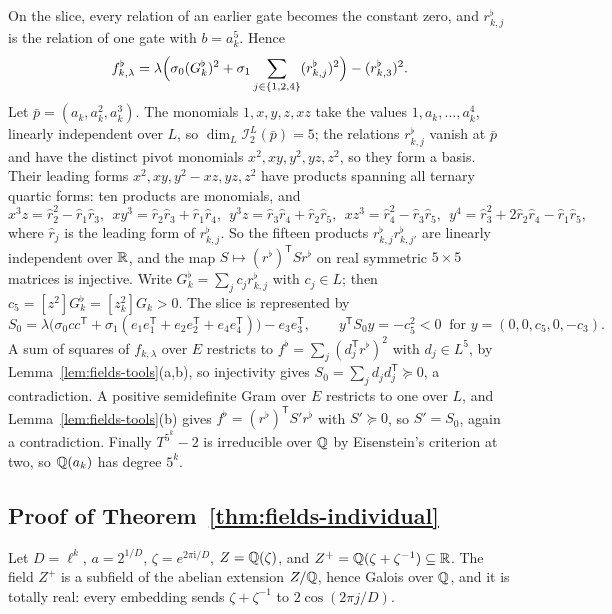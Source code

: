 On the slice, every relation of an earlier gate becomes the constant zero,
and $r_{k,j}^\flat$ is the relation of one gate with $b=a_k^5$. Hence
\[
 f_{k,\lambda}^\flat=\lambda\Bigl(\sigma_0(G_k^\flat)^2+\sigma_1\sum_{j\in\{1,2,4\}}
 (r_{k,j}^\flat)^2\Bigr)-(r_{k,3}^\flat)^2 .
\]
Let $\bar p=(a_k,a_k^2,a_k^3)$. The monomials $1,x,y,z,xz$ take the values
$1,a_k,\ldots,a_k^4$, linearly independent over $L$, so
$\dim_L\mathcal I_2^L(\bar p)=5$; the relations $r^\flat_{k,j}$ vanish at $\bar p$ and have
the distinct pivot monomials $x^2,xy,y^2,yz,z^2$, so they form a basis. Their
leading forms $x^2,xy,y^2-xz,yz,z^2$ have products spanning all ternary
quartic forms: ten products are monomials, and
\[
 x^3z=\hat r_2^2-\hat r_1\hat r_3,\ \ xy^3=\hat r_2\hat r_3+\hat r_1\hat r_4,\ \
 y^3z=\hat r_3\hat r_4+\hat r_2\hat r_5,\ \ xz^3=\hat r_4^2-\hat r_3\hat r_5,\ \
 y^4=\hat r_3^2+2\hat r_2\hat r_4-\hat r_1\hat r_5,
\]
where $\hat r_j$ is the leading form of $r^\flat_{k,j}$. So the fifteen products
$r^\flat_{k,j}r^\flat_{k,j'}$ are linearly independent over $\mathbb R$, and the map
$S\mapsto(r^\flat)^{\mathsf T}Sr^\flat$ on real symmetric $5\times5$ matrices is
injective. Write $G_k^\flat=\sum_jc_jr^\flat_{k,j}$ with $c_j\in L$; then
$c_5=[z^2]G_k^\flat=[z_k^2]G_k>0$. The slice is represented by
\[
 S_0=\lambda\bigl(\sigma_0cc^{\mathsf T}+\sigma_1(e_1e_1^{\mathsf T}
   +e_2e_2^{\mathsf T}+e_4e_4^{\mathsf T})\bigr)-e_3e_3^{\mathsf T},
 \qquad
 y^{\mathsf T}S_0y=-c_5^2<0\ \text{ for }y=(0,0,c_5,0,-c_3).
\]
A sum of squares of $f_{k,\lambda}$ over $E$ restricts to
$f^\flat=\sum_j(d_j^{\mathsf T}r^\flat)^2$ with $d_j\in L^5$, by
Lemma~\ref{lem:fields-tools}(a,b), so injectivity gives
$S_0=\sum_jd_jd_j^{\mathsf T}\succeq0$, a contradiction. A positive
semidefinite Gram over $E$ restricts to one over $L$, and
Lemma~\ref{lem:fields-tools}(b) gives $f^\flat=(r^\flat)^{\mathsf T}S'r^\flat$ with
$S'\succeq0$, so $S'=S_0$, again a contradiction. Finally $T^{5^k}-2$ is
irreducible over $\mathbb Q$ by Eisenstein's criterion at two, so $\mathbb Q(a_k)$ has
degree $5^k$.

\subsection{Proof of Theorem~\ref{thm:fields-individual}}
\label{app:fields-individual}

Let $D=\ell^k$, $a=2^{1/D}$, $\zeta=e^{2\pi\mathrm i/D}$, $Z=\mathbb Q(\zeta)$, and
$Z^+=\mathbb Q(\zeta+\zeta^{-1})\subseteq\mathbb R$. The field $Z^+$ is a subfield of the
abelian extension $Z/\mathbb Q$, hence Galois over $\mathbb Q$, and it is totally real:
every embedding sends $\zeta+\zeta^{-1}$ to $2\cos(2\pi j/D)$.

